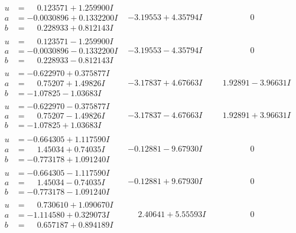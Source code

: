 \documentclass[1p]{elsarticle_modified}
\theoremstyle{definition}
\begin{document}
$$\begin{array}{c|c|c}
\begin{aligned}
u &= \phantom{-}0.123571 + 1.259900 I \\
a &= -0.0030896 + 0.1332200 I \\
b &= \phantom{-}0.228933 + 0.812143 I\end{aligned}
 & -3.19553 + 4.35794 I & \phantom{-0.000000 } 0 \\ \hline\begin{aligned}
u &= \phantom{-}0.123571 - 1.259900 I \\
a &= -0.0030896 - 0.1332200 I \\
b &= \phantom{-}0.228933 - 0.812143 I\end{aligned}
 & -3.19553 - 4.35794 I & \phantom{-0.000000 } 0 \\ \hline\begin{aligned}
u &= -0.622970 + 0.375877 I \\
a &= \phantom{-}0.75207 + 1.49826 I \\
b &= -1.07825 - 1.03683 I\end{aligned}
 & -3.17837 + 4.67663 I & \phantom{-}1.92891 - 3.96631 I \\ \hline\begin{aligned}
u &= -0.622970 - 0.375877 I \\
a &= \phantom{-}0.75207 - 1.49826 I \\
b &= -1.07825 + 1.03683 I\end{aligned}
 & -3.17837 - 4.67663 I & \phantom{-}1.92891 + 3.96631 I \\ \hline\begin{aligned}
u &= -0.664305 + 1.117590 I \\
a &= \phantom{-}1.45034 + 0.74035 I \\
b &= -0.773178 + 1.091240 I\end{aligned}
 & -0.12881 - 9.67930 I & \phantom{-0.000000 } 0 \\ \hline\begin{aligned}
u &= -0.664305 - 1.117590 I \\
a &= \phantom{-}1.45034 - 0.74035 I \\
b &= -0.773178 - 1.091240 I\end{aligned}
 & -0.12881 + 9.67930 I & \phantom{-0.000000 } 0 \\ \hline\begin{aligned}
u &= \phantom{-}0.730610 + 1.090670 I \\
a &= -1.114580 + 0.329073 I \\
b &= \phantom{-}0.657187 + 0.894189 I\end{aligned}
 & \phantom{-}2.40641 + 5.55593 I & \phantom{-0.000000 } 0\\

\end{array}$$
\end{document}
